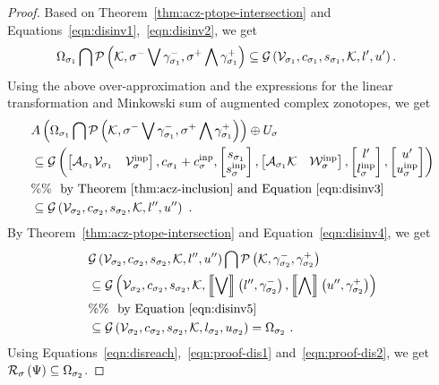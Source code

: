 \begin{proof}
Based on Theorem~\ref{thm:acz-ptope-intersection} and
Equations~\ref{eqn:disinv1},~\ref{eqn:disinv2}, we get
%
\begin{align*}
& \Omega_{\sigma_1}\bigcap\mathcal{P}\left(\mathcal{K},\sigma^-\bigvee \gamma_{\sigma_1}^-,\sigma^+\bigwedge \gamma_{\sigma_1}^+\right)
\subseteq \mathcal{G}\left(\mathcal{V}_{\sigma_1},c_{\sigma_1},s_{\sigma_1},\mathcal{K},l^\prime,u^\prime\right).
\end{align*}
%
Using the above over-approximation and the expressions for the linear
transformation and Minkowski sum of augmented complex zonotopes, we
get
%
\begin{align}
& A\left(\Omega_{\sigma_1}\bigcap\mathcal{P}\left(\mathcal{K},\sigma^-\bigvee \gamma_{\sigma_1}^-,\sigma^+\bigwedge \gamma_{\sigma_1}^+\right)\right)\oplus U_{\sigma}\nonumber\\
& \subseteq \mathcal{G}\left(
\left[\begin{matrix}\mathcal{A}_{\sigma_1}\mathcal{V}_{\sigma_1} & \mathcal{V}^{\operatorname{inp}}_\sigma\end{matrix}\right]
,
c_{\sigma_1}+c^{\operatorname{inp}}_\sigma
,
\left[\begin{matrix}s_{\sigma_1}\\ s^{\operatorname{inp}}_\sigma\end{matrix}\right]
,
\left[\begin{matrix}\mathcal{A}_{\sigma_1}\mathcal{K} & \mathcal{W}^{\operatorname{inp}}_\sigma\end{matrix}\right]
,
\left[\begin{matrix}l^\prime\\l^{\operatorname{inp}}_\sigma\end{matrix}\right]
,
\left[\begin{matrix}u^\prime\\ u^{\operatorname{inp}}_\sigma\end{matrix}\right]
\right)\nonumber\\
& \%\%~~\text{by Theorem~\ref{thm:acz-inclusion} and Equation~\ref{eqn:disinv3}}\nonumber\\
& \subseteq \mathcal{G}\left(\mathcal{V}_{\sigma_2},c_{\sigma_2},s_{\sigma_2},\mathcal{K},l^{\prime\prime},u^{\prime\prime}\right)~\label{eqn:proof-dis1}.
\end{align}
%
By Theorem~\ref{thm:acz-ptope-intersection} and Equation~\ref{eqn:disinv4}, we get
%
\begin{align}
& \mathcal{G}\left(\mathcal{V}_{\sigma_2},c_{\sigma_2},s_{\sigma_2},\mathcal{K},l^{\prime\prime},u^{\prime\prime}\right)\bigcap\mathcal{P}\left(\mathcal{K},\gamma_{\sigma_2}^-,\gamma_{\sigma_2}^+\right)\nonumber\\
& \subseteq \mathcal{G}\left(\mathcal{V}_{\sigma_2},c_{\sigma_2},s_{\sigma_2},\mathcal{K},\left\llbracket\bigvee\right\rrbracket\left(l^{\prime\prime},\gamma_{\sigma_2}^-\right),\left\llbracket\bigwedge\right\rrbracket\left(u^{\prime\prime},\gamma_{\sigma_2}^+\right)\right)\nonumber\\
& \%\%~~\text{by Equation~\ref{eqn:disinv5}}\nonumber\\
& \subseteq \mathcal{G}\left(\mathcal{V}_{\sigma_2},c_{\sigma_2},s_{\sigma_2},\mathcal{K},l_{\sigma_2},u_{\sigma_2}\right)=\Omega_{\sigma_2}~\label{eqn:proof-dis2}.
\end{align}
%
Using Equations~\ref{eqn:disreach},~\ref{eqn:proof-dis1}
and~\ref{eqn:proof-dis2}, we get $\mathcal{R}_{\sigma}\left(\Psi\right)
\subseteq \Omega_{\sigma_2}$.
\end{proof}
